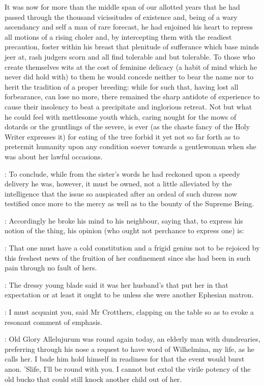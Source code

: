 It was now for more than the
middle span of our allotted years that he had passed through the thousand
vicissitudes of existence
and,
being of a wary ascendancy and self a man
of rare forecast,
he had enjoined his heart to repress all motions of a
rising choler and,
by intercepting them with the readiest precaution,
foster within his breast that plenitude of sufferance which base minds
jeer at,
rash judgers scorn and all find tolerable and but tolerable.
To
those who create themselves wits at the cost of feminine delicacy
(a habit of mind which he never did hold with)
to them he would concede
neither to bear the name nor to herit the tradition of a proper breeding:
while for such that,
having lost all forbearance,
can lose no more,
there remained the sharp antidote of experience to cause their insolency to
beat a precipitate and inglorious retreat.
Not but what he could feel
with mettlesome youth which,
caring nought for the mows of dotards or the
gruntlings of the severe,
is ever
(as the chaste fancy of the Holy Writer expresses it)
for eating of the tree forbid it yet not so far forth as to
pretermit humanity upon any condition soever towards a gentlewoman when
she was about her lawful occasions.

:
To conclude,
while from the sister's words he had reckoned upon a
speedy delivery he was,
however,
it must be owned,
not a little alleviated
by the intelligence that the issue so auspicated after an ordeal of such
duress now testified once more to the mercy as well as to the bounty of
the Supreme Being.



:
Accordingly he broke his mind to his neighbour,
saying that,
to express his notion of the thing,
his opinion
(who ought not perchance to express one)
is:

\Bloom:
That one must have a cold constitution and a frigid genius not
to be rejoiced by this freshest news of the fruition of her confinement
since she had been in such pain through no fault of hers.

:
The dressy young blade said it was her husband's that put her in that
expectation or at least it ought to be unless she were another Ephesian
matron.

:
I must acquaint you,
said Mr Crotthers,
clapping on the table so as
to evoke a resonant comment of emphasis.

\crotthers:
Old Glory Allelujurum was round again today,
an elderly man with
dundrearies,
preferring through his nose a request to have word of
Wilhelmina,
my life,
as he calls her.
I bade him hold himself in readiness
for that the event would burst anon.
'Slife,
I'll be round with you.
I cannot but extol the virile potency of the old bucko that could still
knock another child out of her.

